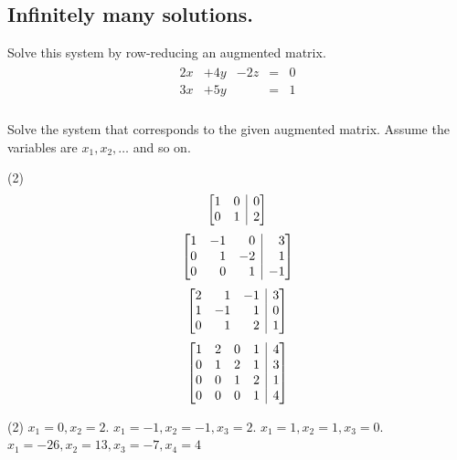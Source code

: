 \documentclass[12pt,fleqn]{book}
\makeatletter
\newenvironment{amatrix}[1]{%
	  \left[\begin{array}{@{}*{#1}{r}|r@{}}
	}{
	  \end{array}\right]
	}
\newcommand{\prb}[1]{\begin{Exercise}#1\end{Exercise}}
\newcommand{\sol}[1]{\begin{Answer}#1\end{Answer}}
\makeatother
\begin{document}
\subsection*{Infinitely many solutions.}
Solve this system by row-reducing an augmented matrix.
\begin{align*}
	\begin{array}{rrrrr}
		2x & +4y & -2z & = & 0 \\
		3x & +5y &     & = & 1 \\
	\end{array}
\end{align*}
\clearpage
\prb{Solve the system that corresponds to the given augmented matrix.  Assume the variables are $x_1,x_2,\ldots$ and so on.
	\begin{tasks}(2)
		\task \vspace{-2.3em}
		\begin{align*}
			\begin{amatrix}{2}
				1&0&0\\
				0&1&2
			\end{amatrix}
		\end{align*}
		\task \vspace{-2.3em}
		\begin{align*}
			\begin{amatrix}{3}
				1&-1&0&3\\
				0&1&-2&1\\
				0&0&1&-1
			\end{amatrix}
		\end{align*}
		\vspace{2in}
		\task \vspace{-2.3em}
		\begin{align*}
			\begin{amatrix}{3}
				2&1&-1&3\\
				1&-1&1&0\\
				0&1&2&1
			\end{amatrix}
		\end{align*}
		\task \vspace{-2.3em}
		\begin{align*}
			\begin{amatrix}{4}
				1&2&0&1&4\\
				0&1&2&1&3\\
				0&0&1&2&1\\
				0&0&0&1&4
			\end{amatrix}
		\end{align*}
	\end{tasks}
}
\sol{
	\begin{tasks}(2)
		\task $x_1=0,x_2=2$.
		\task $x_1=-1,x_2=-1,x_3=2$.
		\task $x_1=1,x_2=1,x_3=0$.
		\task $x_1=-26,x_2=13,x_3=-7,x_4=4$
	\end{tasks}
}
\end{document}
